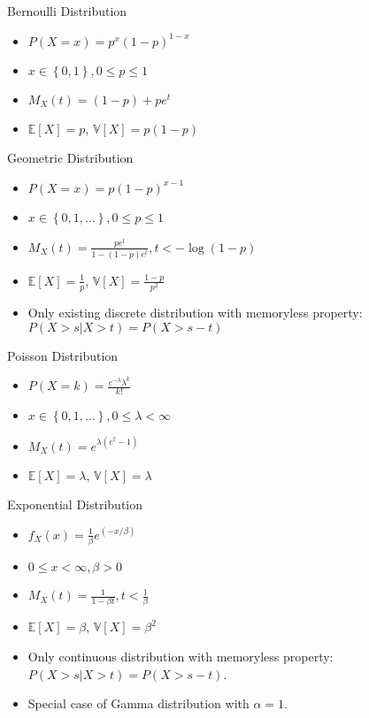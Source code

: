 \documentclass[avery5371,grid]{flashcards}
\begin{document}
\begin{flashcard}[Definition]{Bernoulli Distribution}
\begin{itemize}
\item $P\left(X=x\right)=p^{x}\left(1-p\right)^{1-x}$
\item $x \in \left \{ 0,1\right\},0\le p\le1$
\item $M_{X}\left(t\right)=\left(1-p\right)+pe^{t}$
\item $\mathbb{E}\left[X\right]=p$, $\mathbb{V}\left[X\right]=p\left(1-p\right)$
\end{itemize}
\end{flashcard}

\begin{flashcard}[Definition]{Geometric Distribution}
\begin{itemize}
\item $P\left(X=x\right)=p (1-p)^{x-1}$
\item $x \in \left\{ 0,1, \ldots \right\},0\le p\le1$
\item $M_{X}\left(t\right)=\frac{p e^t}{1 - (1 - p) e^t}, t < - \log (1-p)$
\item $\mathbb{E}\left[X\right]=\frac{1}{p}$, $\mathbb{V}\left[X\right]= \frac{1-p}{p^2}$
\item Only existing discrete distribution with memoryless property: $P(X>s|X>t) = P(X>s-t)$
\end{itemize}
\end{flashcard}

\begin{flashcard}[Definition]{Poisson Distribution}
\begin{itemize}
\item $P\left(X=k\right)= \frac{e^{-\lambda} \lambda^k}{k!}$
\item $x \in \left\{ 0,1, \ldots \right\},0\le \lambda < \infty$
\item $M_{X}\left(t\right)= e^{\lambda(e^t - 1)}$
\item $\mathbb{E}\left[X\right]=\lambda$, $\mathbb{V}\left[X\right]= \lambda$
\end{itemize}
\end{flashcard}

\begin{flashcard}[Definition]{Exponential Distribution}
\begin{itemize}
\item $f_X(x) = \frac{1}{\beta} e^{(-x/\beta)}$
\item $ 0 \le x < \infty, \beta > 0$
\item $M_{X}\left(t\right)= \frac{1}{1-\beta t}, t<\frac{1}{\beta}$
\item $\mathbb{E}\left[X\right]=\beta$, $\mathbb{V}\left[X\right]= \beta^2$
\item Only continuous distribution with memoryless property: $P(X>s|X>t) = P(X>s-t)$. 
\item Special case of Gamma distribution with $\alpha = 1$.
\end{itemize}
\end{flashcard}
\end{document}
